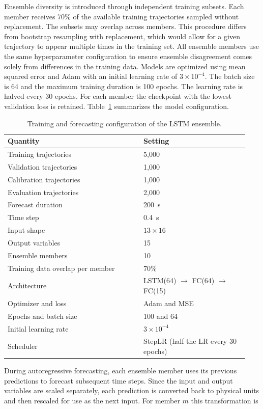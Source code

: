 Ensemble diversity is introduced through independent training subsets. Each member receives 70\% of the available training trajectories sampled without replacement. The subsets may overlap across members. This procedure differs from bootstrap resampling with replacement, which would allow for a given trajectory to appear multiple times in the training set. All ensemble members use the same hyperparameter configuration to ensure ensemble disagreement comes solely from differences in the training data. Models are optimized using mean squared error and Adam with an initial learning rate of $3\times10^{-4}$. The batch size is 64 and the maximum training duration is 100 epochs. The learning rate is halved every 30 epochs. For each member the checkpoint with the lowest validation loss is retained. Table~\ref{tab:mace:training} summarizes the model configuration.

\begin{table}[t]
\centering\small
\caption{Training and forecasting configuration of the LSTM ensemble.}
\label{tab:mace:training}
\begin{tabular}{@{}p{0.53\linewidth}p{0.41\linewidth}@{}}
\toprule
Quantity & Setting\\
\midrule
Training trajectories & 5{,}000\\
Validation trajectories & 1{,}000\\
Calibration trajectories & 1{,}000\\
Evaluation trajectories & 2{,}000\\
Forecast duration & 200~s\\
Time step & 0.4~s\\
Input shape & $13\times16$\\
Output variables & 15\\
Ensemble members & 10\\
Training data overlap per member & 70\%\\
Architecture & LSTM(64) $\to$ FC(64) $\to$ FC(15)\\
Optimizer and loss & Adam and MSE\\
Epochs and batch size & 100 and 64\\
Initial learning rate & $3\times10^{-4}$\\
Scheduler & StepLR (half the LR every 30 epochs)\\
\bottomrule
\end{tabular}
\end{table}

During autoregressive forecasting, each ensemble member uses its previous predictions to forecast subsequent time steps. Since the input and output variables are scaled separately, each prediction is converted back to physical units and then rescaled for use as the next input. For member $m$ this transformation is

